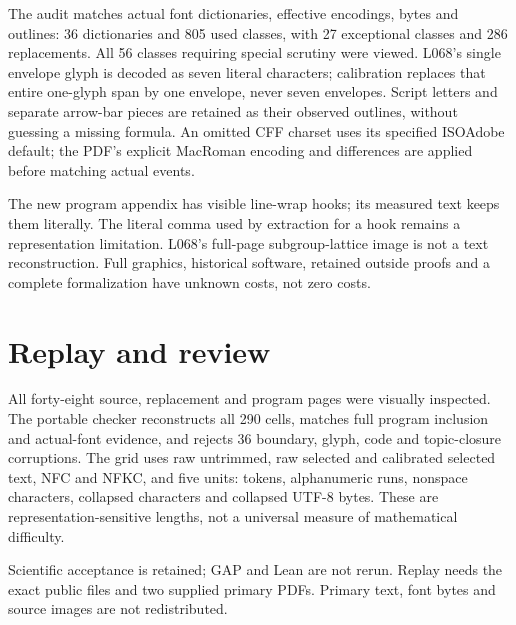 \documentclass[11pt,a4paper]{article}
\begin{document}
The audit matches actual font dictionaries, effective encodings, bytes and outlines: 36 dictionaries and 805 used classes, with 27 exceptional classes and 286 replacements. All 56 classes requiring special scrutiny were viewed. L068's single envelope glyph is decoded as seven literal characters; calibration replaces that entire one-glyph span by one envelope, never seven envelopes. Script letters and separate arrow-bar pieces are retained as their observed outlines, without guessing a missing formula. An omitted CFF charset uses its specified ISOAdobe default; the PDF's explicit MacRoman encoding and differences are applied before matching actual events.

The new program appendix has visible line-wrap hooks; its measured text keeps them literally. The literal comma used by extraction for a hook remains a representation limitation. L068's full-page subgroup-lattice image is not a text reconstruction. Full graphics, historical software, retained outside proofs and a complete formalization have unknown costs, not zero costs.

\section*{Replay and review}
All forty-eight source, replacement and program pages were visually inspected. The portable checker reconstructs all 290 cells, matches full program inclusion and actual-font evidence, and rejects 36 boundary, glyph, code and topic-closure corruptions. The grid uses raw untrimmed, raw selected and calibrated selected text, NFC and NFKC, and five units: tokens, alphanumeric runs, nonspace characters, collapsed characters and collapsed UTF-8 bytes. These are representation-sensitive lengths, not a universal measure of mathematical difficulty.

Scientific acceptance is retained; GAP and Lean are not rerun. Replay needs the exact public files and two supplied primary PDFs. Primary text, font bytes and source images are not redistributed.
\end{document}
